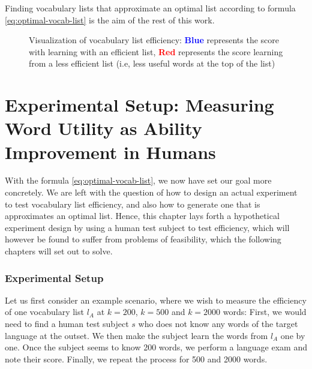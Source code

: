 Finding vocabulary lists that approximate an optimal list according to formula \ref{eq:optimal-vocab-list} is the aim of the rest of this work.

\begin{figure}[H]
	\centering
	\caption{Visualization of vocabulary list efficiency: \textbf{\textcolor{blue}{Blue}} represents the score with learning with an efficient list, \textbf{\textcolor{red}{Red}} represents the score learning from a less efficient list (i.e, less useful words at the top of the list)}
	\label{fig:voc-list-efficiency}
\end{figure}

\section{Experimental Setup: Measuring Word Utility as Ability Improvement in Humans} \label{sec:human-efficiency-testing}


With the formula \ref{eq:optimal-vocab-list}, we now have set our goal more concretely.
We are left with the question of how to design an actual experiment to test vocabulary list efficiency, and also how to generate one that is approximates an optimal list.
Hence, this chapter lays forth a hypothetical experiment design by using a human test subject to test efficiency, which will however be found to suffer from problems of feasibility, which the following chapters will set out to solve.

\subsubsection{Experimental Setup}
Let us first consider an example scenario, where we wish to measure the efficiency of one vocabulary list $l_A$ at $k=200$, $k=500$ and $k=2000$ words:
First, we would need to find a human test subject $s$ who does not know any words of the target language at the outset.
We then make the subject learn the words from $l_A$ one by one.
Once the subject seems to know 200 words, we perform a language exam and note their score.
Finally, we repeat the process for 500 and 2000 words.

